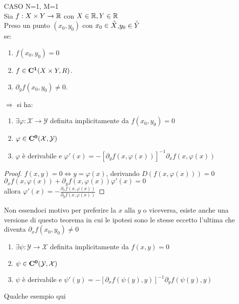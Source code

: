 \proposition CASO N=1, M=1\\
Sia $f:X\times Y\rightarrow \mathbb{R}$ con $X\in \mathbb{R}, Y\in \mathbb{R}$\\
Preso un punto $(x_0,y_0)$ con $x_0\in \accentset{\circ}{X}$,$y_0\in \accentset{\circ}{Y}$\\
se:
\begin{enumerate}
	\item $f(x_0,y_0)=0$
	\item $f\in \mathbf{C^{1}}(X\times Y,R)$.
	\item $\partial_yf(x_0,y_0)\ne 0$.
\end{enumerate}
$\Rightarrow $ si ha:\\
\begin{enumerate}
	\item $\exists \varphi: \mathcal{X}\rightarrow\mathcal{Y}$ definita implicitamente da $f(x_0,y_0)=0$
	\item $\varphi\in \mathbf{C^{0}}(\mathcal{X},\mathcal{Y})$
	\item $\varphi$ è derivabile e $\varphi'(x)=-[\partial_yf(x,\varphi(x))]^{-1}\partial_xf(x,\varphi(x))$
\end{enumerate}
\begin{proof}
	$f(x,y)=0\iff y=\varphi(x)$, derivando $D(f(x,\varphi(x)))=0$\\
	$\partial_xf(x,\varphi(x))+\partial_yf(x,\varphi(x))\varphi'(x)=0$\\
	allora $\varphi'(x) = -\frac{\partial_xf(x,\varphi(x))}{\partial_yf(x,\varphi(x))}$
\end{proof}
\observation Non essendoci motivo per preferire la $x$ alla $y$ o viceversa, esiste anche una versione di questo teorema  in  cui le ipotesi sono le stesse eccetto l'ultima che diventa $\partial_xf(x_0,y_0)\ne 0$
\begin{enumerate}
	\item $\exists \psi: \mathcal{Y}\rightarrow\mathcal{X}$ definita implicitamente da $f(x,y)=0$
	\item $\psi\in \mathbf{C^{0}}(\mathcal{Y},\mathcal{X})$
	\item $\psi$ è derivabile e $\psi'(y)=-[\partial_xf(\psi(y),y)]^{-1}\partial_yf(\psi(y),y)$
\end{enumerate}
Qualche esempio qui\\
